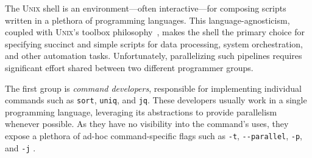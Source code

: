 \documentclass[sigplan, review, screen, anonymous]{acmart}
\newcommand{\ttt}[1]{\texttt{#1}}
\newcommand{\kk}[1]{[{\color{magenta}kk: #1}]}
\newcommand\blfootnote[1]{%
  \begingroup
  \renewcommand\thefootnote{}\footnote{#1}%
  \addtocounter{footnote}{-1}%
  \endgroup
}
\newcommand{\unix}{{\scshape Unix}\xspace}
\begin{document}
%
% 
% 


The \unix shell is an environment---often interactive---for composing scripts written in a plethora of programming languages.
This language-agnosticism, coupled with \unix's toolbox philosophy~\cite{mcilroy1978unix}, makes the shell the primary choice for specifying succinct and simple scripts for data processing, system orchestration, and other automation tasks.
Unfortunately, parallelizing such pipelines requires significant effort shared between two different programmer groups. %

The first group is \emph{command developers}, responsible for implementing individual commands such as \ttt{sort}, \ttt{uniq}, and \ttt{jq}.
These developers usually work in a single programming language, leveraging its abstractions to provide parallelism whenever possible.
As they have no visibility into the command's uses, they expose a plethora of ad-hoc command-specific flags such as \ttt{-t}, \ttt{-}\ttt{-parallel}, \ttt{-p}, and \ttt{-j} %
\cite{pasetto2011comparative, mcilroy1993engineering, stallman1991gnu}.
\end{document}
